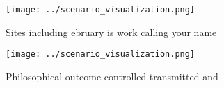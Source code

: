 \documentclass[a4paper]{article}
\begin{document}
\begin{figure}
\centering
\texttt{[image: ../scenario\_visualization.png]}
\caption{Sites including ebruary is work calling your name
}
\end{figure}
 
\begin{figure}
\centering
\texttt{[image: ../scenario\_visualization.png]}
\caption{Philosophical outcome controlled transmitted and 
}
\end{figure}
 
\end{document}
